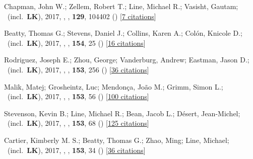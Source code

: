\item[{\color{numcolor}\scriptsize16}] Chapman, John W.; Zellem, Robert T.; Line, Michael R.; Vasisht, Gautam; \etal\ (incl.\ \textbf{LK}), 2017, , \pasp, \textbf{129}, 104402 () [\href{https://ui.adsabs.harvard.edu/abs/2017PASP..129j4402C}{7 citations}]

\item[{\color{numcolor}\scriptsize15}] Beatty, Thomas G.; Stevens, Daniel J.; Collins, Karen A.; Col{\'o}n, Knicole D.; \etal\ (incl.\ \textbf{LK}), 2017, , \aj, \textbf{154}, 25 () [\href{https://ui.adsabs.harvard.edu/abs/2017AJ....154...25B}{16 citations}]

\item[{\color{numcolor}\scriptsize14}] Rodriguez, Joseph E.; Zhou, George; Vanderburg, Andrew; Eastman, Jason D.; \etal\ (incl.\ \textbf{LK}), 2017, , \aj, \textbf{153}, 256 () [\href{https://ui.adsabs.harvard.edu/abs/2017AJ....153..256R}{36 citations}]

\item[{\color{numcolor}\scriptsize13}] Malik, Matej; Grosheintz, Luc; Mendon{\c{c}}a, Jo{\~a}o M.; Grimm, Simon L.; \etal\ (incl.\ \textbf{LK}), 2017, , \aj, \textbf{153}, 56 () [\href{https://ui.adsabs.harvard.edu/abs/2017AJ....153...56M}{100 citations}]

\item[{\color{numcolor}\scriptsize12}] Stevenson, Kevin B.; Line, Michael R.; Bean, Jacob L.; D{\'e}sert, Jean-Michel; \etal\ (incl.\ \textbf{LK}), 2017, , \aj, \textbf{153}, 68 () [\href{https://ui.adsabs.harvard.edu/abs/2017AJ....153...68S}{125 citations}]

\item[{\color{numcolor}\scriptsize11}] Cartier, Kimberly M. S.; Beatty, Thomas G.; Zhao, Ming; Line, Michael; \etal\ (incl.\ \textbf{LK}), 2017, , \aj, \textbf{153}, 34 () [\href{https://ui.adsabs.harvard.edu/abs/2017AJ....153...34C}{36 citations}]

